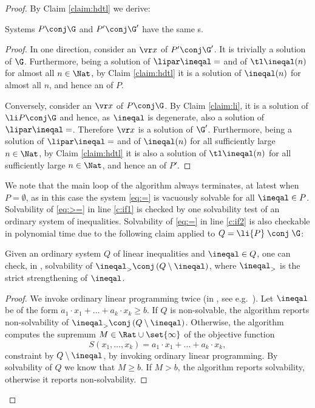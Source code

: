 \begin{proof}
By Claim \ref{claim:hdtl} we derive:
%
\begin{claim}  \label{claim:samesol}
Systems $P\conj\G$ and $P'\conj\G'$ have the same {\aasol}s.
\end{claim}
%
\begin{proof}
In one direction, 
consider an \aasol $\vr x$ of $P'\conj\G'$.
It is trivially a solution of $\G$. 
Furthermore, being a solution of $\lipar \ineqal =$ and of $\tl \ineqal(n)$ for almost all $n\in\Nat$,
by Claim \ref{claim:hdtl} it is a solution of $\ineqal(n)$ for almost all $n$, and hence an \aasol of $P$.

Conversely, 
consider an \aasol $\vr x$ of $P\conj\G$.
By Claim \ref{claim:li}, it is a solution of $\li P\conj\G$ and hence, 
as $\ineqal$ is degenerate,
also a solution of $\lipar \ineqal =$.
Therefore $\vr x$ is a solution of $\G'$.
Furthermore, being a solution of $\lipar \ineqal =$ and of $\ineqal(n)$ for all sufficiently large
$n\in\Nat$, 
by Claim \ref{claim:hdtl} it is also a solution of $\tl \ineqal(n)$ for all sufficiently large $n\in\Nat$, 
and hence an \aasol of $P'$.
\end{proof}
%

We note that the main loop of the algorithm always terminates, at latest when $P=\emptyset$, as in this case the system
\eqref{eq:=} is vacuously solvable for all $\ineqal\in P$.
%
%
Solvability of \eqref{eq:>=} in line \ref{c:if1} 
is checked by one solvability test of an ordinary system of inequalities.
Solvability of \eqref{eq:=} in line \ref{c:if2} is also checkable in polynomial time due to the following claim
applied to $Q = \li {P} \; \conj \; \G$:
%
\begin{claim} 
Given an ordinary system $Q$ of linear inequalities and $\ineqal \in Q$, one can check,
in \PTIME,
solvability of \xspace $\ineqal_>  \conj \, (Q\setminus\ineqal)$, where $\ineqal_>$ is the strict
strengthening of $\ineqal$.
\end{claim}
%
\begin{proof}
We invoke ordinary linear programming twice 
(in \PTIME, see e.g.~\cite[Section 8.7]{PSbook82}).
Let $\ineqal$ be of the form $a_1 \cdot x_1 + \ldots + a_k \cdot x_k \geq b$.
If $Q$ is non-solvable, the algorithm reports non-solvability of 
$\ineqal_>  \conj \, (Q\setminus\ineqal)$.
Otherwise, the algorithm computes the supremum $M\in\Rat\cup \set{\infty}$ of the objective function 
\[
S(x_1, \ldots, x_k) = a_1 \cdot x_1 + \ldots + a_k \cdot x_k,
\]
constraint by $Q\setminus\ineqal$, by invoking ordinary linear programming.
By solvability of $Q$ we know that $M\geq b$.
If $M > b$, the algorithm reports solvability, otherwise it reports non-solvability.
\end{proof}



\end{proof}
